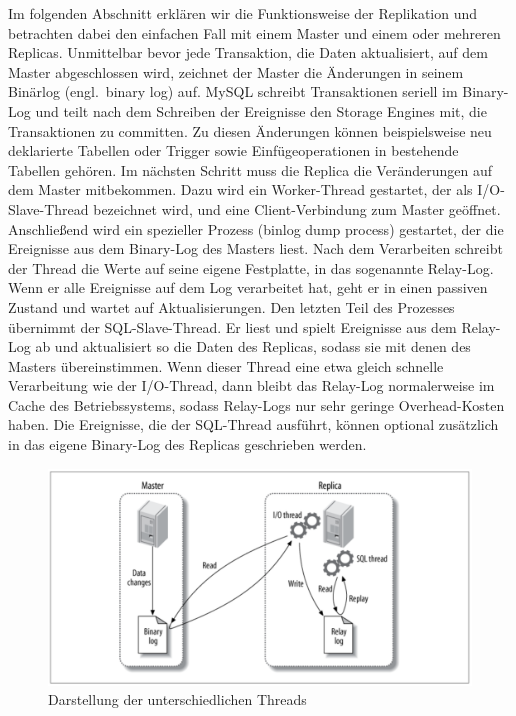 Im folgenden Abschnitt erklären wir die Funktionsweise der Replikation und betrachten dabei den einfachen Fall mit einem Master und einem oder mehreren Replicas.
Unmittelbar bevor jede Transaktion, die Daten aktualisiert, auf dem Master abgeschlossen wird, zeichnet der Master die Änderungen in seinem Binärlog (engl.\ binary log) auf.
MySQL schreibt Transaktionen seriell im Binary-Log und teilt nach dem Schreiben der Ereignisse den Storage Engines mit, die Transaktionen zu committen.
Zu diesen Änderungen können beispielsweise neu deklarierte Tabellen oder Trigger sowie Einfügeoperationen in bestehende Tabellen gehören.
Im nächsten Schritt muss die Replica die Veränderungen auf dem Master mitbekommen.
Dazu wird ein Worker-Thread gestartet, der als I/O-Slave-Thread bezeichnet wird, und eine Client-Verbindung zum Master geöffnet.
Anschließend wird ein spezieller Prozess (binlog dump process) gestartet, der die Ereignisse aus dem Binary-Log des Masters liest.
Nach dem Verarbeiten schreibt der Thread die Werte auf seine eigene Festplatte, in das sogenannte Relay-Log.
Wenn er alle Ereignisse auf dem Log verarbeitet hat, geht er in einen passiven Zustand und wartet auf Aktualisierungen.
Den letzten Teil des Prozesses übernimmt der SQL-Slave-Thread.
Er liest und spielt Ereignisse aus dem Relay-Log ab und aktualisiert so die Daten des Replicas, sodass sie mit denen des Masters übereinstimmen.
Wenn dieser Thread eine etwa gleich schnelle Verarbeitung wie der I/O-Thread, dann bleibt das Relay-Log normalerweise im Cache des Betriebssystems, sodass Relay-Logs nur sehr geringe Overhead-Kosten haben.
Die Ereignisse, die der SQL-Thread ausführt, können optional zusätzlich in das eigene Binary-Log des Replicas geschrieben werden.

\begin{figure}[H]
  \centering
  \includegraphics[width=.8\textwidth]{PNGs/Textbook/Master_Replica}
  \caption[Master-Replica-Visualisierung]{Darstellung der unterschiedlichen Threads}
  \label{fig:master-replica}
\end{figure}
\vspace{-15pt}

